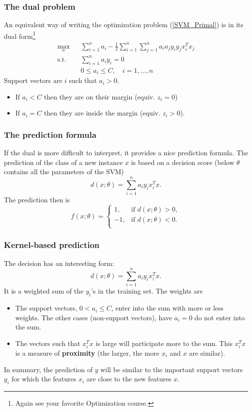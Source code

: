 \begin{frame}
\frametitle{The dual problem}
An equivalent way of writing the optimization problem (\ref{SVM_Primal}) is in its dual form\footnote{Again see your favorite Optimization course.}
\begin{eqnarray}
\label{SVM_Dual}
\nonumber \max_{a} &&   \sum_{i=1}^n a_i - \frac{1}{2}\sum_{i=1}^n\sum_{j=1}^n a_i a_j y_iy_j x_i^Tx_j\\
\mbox{s.t. } && \sum_{i=1}^n a_i y_i = 0\\
\nonumber && 0 \leq a_i \leq C, \quad i=1,\ldots ,n
\end{eqnarray}
Support vectors are $i$ such that $a_i>0$. 
\begin{itemize}
\item If $a_i < C$ then they are on their margin (equiv. $z_i=0$)
\item If $a_i=C$ then they are inside the margin (equiv. $z_i>0$).
\end{itemize}
\end{frame}
\begin{frame}
\frametitle{The prediction formula}
If the dual is more difficult to interpret, it provides a nice prediction formula. The prediction of the class of a new instance $x$ is based on a decision score (below $\theta$ contains all the parameters of the SVM)
$$
d(x;\theta) = \sum_{i=1}^n a_i y_i x_i^Tx.
$$
The prediction then is  
$$
f(x;\theta) = \left\{
\begin{array}{rl}
1, & \mbox{if } d(x;\theta) > 0,\\
-1, & \mbox{if } d(x;\theta) < 0.\\
\end{array}
\right.
$$
\end{frame}
\begin{frame}
\frametitle{Kernel-based prediction}
The decision has an interesting form:
$$
d(x;\theta) = \sum_{i=1}^n a_i y_i x_i^Tx.
$$
It is a weighted sum of the $y_i$'s in the training set. The weights are
\begin{itemize}
\item The support vectors, $0 < a_i \leq C$, enter into the sum with more or less weights. The other cases (non-support vectors), have $a_i=0$ do not enter into the sum.
\item The vectors such that $x_i^Tx$ is large will participate more to the sum. This $x_i^Tx$ is a measure of {\bf proximity} (the larger, the more $x_i$ and $x$ are similar). 
\end{itemize}
In summary, the prediction of $y$ will be similar to the important support vectors $y_i$ for which the features $x_i$ are close to the new features $x$.
\end{frame}
